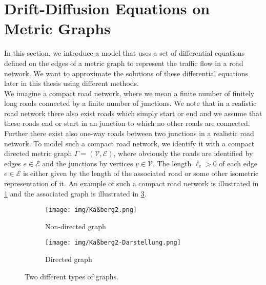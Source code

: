 \section{Drift-Diffusion Equations on Metric Graphs}
\label{ch1:sec2}

In this section, we introduce a model that uses a set of differential equations defined on the edges of a metric graph to represent the traffic flow in a road network. We want to approximate the solutions of these differential equations later in this thesis using different methods.  \\
We imagine a compact road network, where we mean a finite number of finitely long roads connected by a finite number of junctions. We note that in a realistic road network there also exist roads which simply start or end and we assume that these roads end or start in an junction to which no other roads are connected. Further there exist also one-way roads between two junctions in a realistic road network. To model such a compact road network, we identify it with a compact directed metric graph $\Gamma = (\mathcal{V}, \mathcal{E})$, where obviously the roads are identified by edges $e \in \mathcal{E}$ and the junctions by vertices $v \in \mathcal{V}$. The length $\ell_e > 0$ of each edge $e \in \mathcal{E}$ is either given by the length of the associated road or some other isometric representation of it. An example of such a compact road network is illustrated in \cref{fig8:f1} and the associated graph is illustrated in \cref{fig8:f2}. \\

\begin{figure}[H]
    \begin{center}
        \begin{subfigure}[b]{0.4\textwidth}
            \begin{center}
                \texttt{[image: img/Kaßberg2.png]}
            \end{center}
            \caption{Non-directed graph}
            \label{fig8:f1}
        \end{subfigure}
        \begin{subfigure}[b]{0.4\textwidth}
            \begin{center}
                \texttt{[image: img/Kaßberg2-Darstellung.png]}
            \end{center}
            \caption{Directed graph}
            \label{fig8:f2}
        \end{subfigure}
    \end{center}
    \caption{Two different types of graphs.}
\end{figure}

